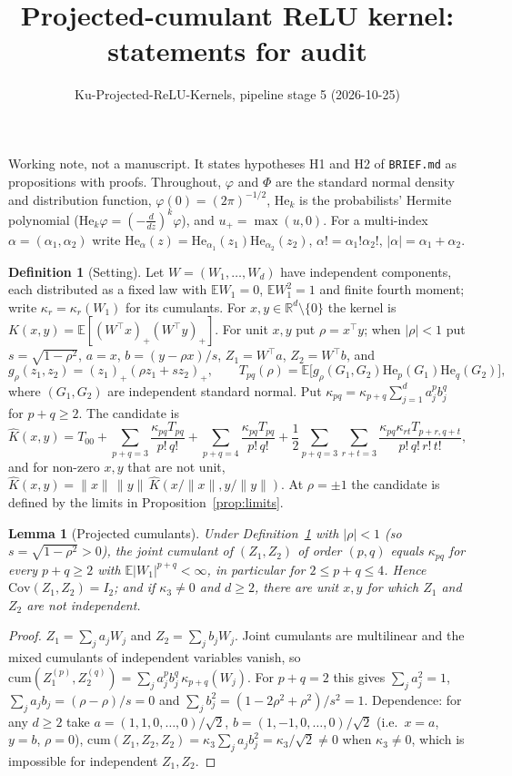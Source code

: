 \documentclass[11pt]{article}
\title{Projected-cumulant ReLU kernel: statements for audit}
\author{Ku-Projected-ReLU-Kernels, pipeline stage 5 (2026-10-25)}
\date{}
\newtheorem{lemma}{Lemma}
\theoremstyle{definition}
\newtheorem{definition}{Definition}
\newcommand{\E}{\mathbb{E}}
\newcommand{\R}{\mathbb{R}}
\newcommand{\He}{\mathrm{He}}
\begin{document}
\maketitle

Working note, not a manuscript. It states hypotheses H1 and H2 of
\texttt{BRIEF.md} as propositions with proofs. Throughout, $\varphi$ and $\Phi$
are the standard normal density and distribution function, $\varphi(0)=(2\pi)^{-1/2}$,
$\He_k$ is the probabilists' Hermite polynomial ($\He_k\varphi=(-\tfrac{d}{dz})^k\varphi$),
and $u_+=\max(u,0)$. For a multi-index $\alpha=(\alpha_1,\alpha_2)$ write
$\He_\alpha(z)=\He_{\alpha_1}(z_1)\He_{\alpha_2}(z_2)$, $\alpha!=\alpha_1!\alpha_2!$,
$|\alpha|=\alpha_1+\alpha_2$.

\begin{definition}[Setting]\label{def:setting}
Let $W=(W_1,\dots,W_d)$ have independent components, each distributed as a fixed law
with $\E W_1=0$, $\E W_1^2=1$ and finite fourth moment; write $\kappa_r=\kappa_r(W_1)$ for
its cumulants. For $x,y\in\R^d\setminus\{0\}$ the kernel is
$K(x,y)=\E[(W^\top x)_+(W^\top y)_+]$. For unit $x,y$ put $\rho=x^\top y$; when
$|\rho|<1$ put $s=\sqrt{1-\rho^2}$, $a=x$, $b=(y-\rho x)/s$, $Z_1=W^\top a$,
$Z_2=W^\top b$, and
\[
g_\rho(z_1,z_2)=(z_1)_+(\rho z_1+s z_2)_+ ,\qquad
T_{pq}(\rho)=\E\big[g_\rho(G_1,G_2)\He_p(G_1)\He_q(G_2)\big],
\]
where $(G_1,G_2)$ are independent standard normal. Put
$\kappa_{pq}=\kappa_{p+q}\sum_{j=1}^d a_j^p b_j^q$ for $p+q\ge 2$. The candidate is
\[
\widehat K(x,y)=T_{00}
+\sum_{p+q=3}\frac{\kappa_{pq}T_{pq}}{p!\,q!}
+\sum_{p+q=4}\frac{\kappa_{pq}T_{pq}}{p!\,q!}
+\frac12\sum_{p+q=3}\sum_{r+t=3}\frac{\kappa_{pq}\kappa_{rt}T_{p+r,q+t}}{p!\,q!\,r!\,t!},
\]
and for non-zero $x,y$ that are not unit,
$\widehat K(x,y)=\|x\|\,\|y\|\,\widehat K(x/\|x\|,y/\|y\|)$.
At $\rho=\pm1$ the candidate is defined by the limits in
Proposition~\ref{prop:limits}.
\end{definition}

\begin{lemma}[Projected cumulants]\label{lem:cumulants}
Under Definition~\ref{def:setting} with $|\rho|<1$ (so $s=\sqrt{1-\rho^2}>0$), the joint
cumulant of $(Z_1,Z_2)$ of order $(p,q)$ equals $\kappa_{pq}$ for every $p+q\ge2$ with
$\E|W_1|^{p+q}<\infty$, in particular for $2\le p+q\le4$. Hence
$\mathrm{Cov}(Z_1,Z_2)=I_2$; and if $\kappa_3\neq0$ and $d\ge2$, there are unit $x,y$ for
which $Z_1$ and $Z_2$ are not independent.
\end{lemma}

\begin{proof}
$Z_1=\sum_j a_jW_j$ and $Z_2=\sum_j b_jW_j$. Joint cumulants are multilinear and the
mixed cumulants of independent variables vanish, so
$\mathrm{cum}(Z_1^{(p)},Z_2^{(q)})=\sum_j a_j^pb_j^q\,\kappa_{p+q}(W_j)$.
For $p+q=2$ this gives $\sum_ja_j^2=1$, $\sum_ja_jb_j=(\rho-\rho)/s=0$ and
$\sum_j b_j^2=(1-2\rho^2+\rho^2)/s^2=1$. Dependence: for any $d\ge2$ take
$a=(1,1,0,\dots,0)/\sqrt2$, $b=(1,-1,0,\dots,0)/\sqrt2$ (i.e.\ $x=a$, $y=b$, $\rho=0$),
$\mathrm{cum}(Z_1,Z_2,Z_2)=\kappa_3\sum_ja_jb_j^2=\kappa_3/\sqrt2\neq0$ when
$\kappa_3\neq0$, which is impossible for independent $Z_1,Z_2$.
\end{proof}
\end{document}

